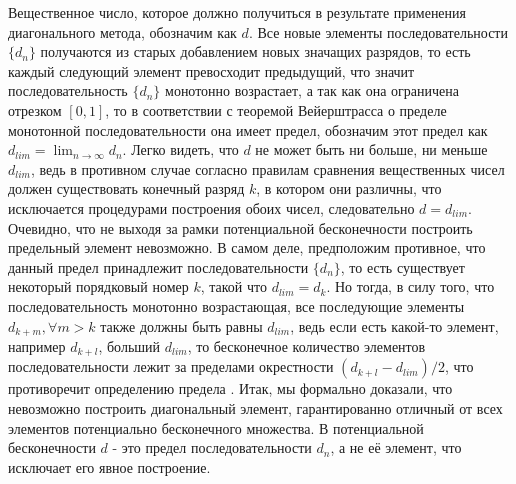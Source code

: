 \documentclass[12pt]{article}
\begin{document}
Вещественное число, которое должно получиться в результате применения диагонального метода, обозначим как $d$. Все новые элементы последовательности $\{d_n\}$ получаются из старых добавлением новых значащих разрядов, то есть каждый следующий элемент превосходит предыдущий, что значит последовательность $\{d_n\}$ монотонно возрастает, а так как она ограничена отрезком $[0, 1]$, то в соответствии с теоремой Вейерштрасса о пределе монотонной последовательности \cite{matan-weierstrass} она имеет предел, обозначим этот предел как $d_{lim} = \lim_{n\to\infty} d_n$. Легко видеть, что $d$ не может быть ни больше, ни меньше $d_{lim}$, ведь в противном случае согласно правилам сравнения вещественных чисел \cite{matan-decimal} должен существовать конечный разряд $k$, в котором они различны, что исключается процедурами построения обоих чисел, следовательно $d = d_{lim}$. Очевидно, что не выходя за рамки потенциальной бесконечности построить предельный элемент невозможно. В самом деле, предположим противное, что данный предел принадлежит последовательности $\{d_n\}$, то есть существует некоторый порядковый номер $k$, такой что $d_{lim} = d_k$. Но тогда, в силу того, что последовательность монотонно возрастающая, все последующие элементы $d_{k + m}, \forall m > k$ также должны быть равны $d_{lim}$, ведь если есть какой-то элемент, например $d_{k + l}$, больший $d_{lim}$, то бесконечное количество элементов последовательности лежит за пределами окрестности $(d_{k + l} - d_{lim})/2$, что противоречит определению предела \cite{matan-define-limit}. Итак, мы формально доказали, что невозможно построить диагональный элемент, гарантированно отличный от всех элементов потенциально бесконечного множества. В потенциальной бесконечности $d$ - это предел последовательности ${d_n}$, а не её элемент, что исключает его явное построение.
\end{document}
